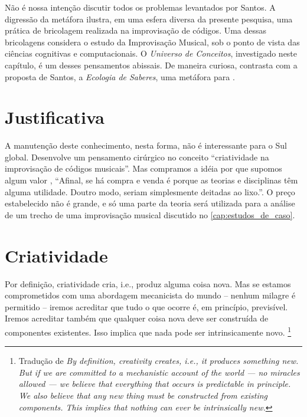 Não é nossa intenção discutir todos os problemas levantados por Santos. A digressão da metáfora  ilustra, em uma esfera diversa da presente pesquisa, uma prática de bricolagem realizada na improvisação de códigos. Uma dessas bricolagens considera o estudo da Improvisação Musical, sob o ponto de vista das ciências cognitivas e computacionais. O \emph{Universo de Conceitos}, investigado neste capítulo, é um desses pensamentos abissais. De maneira curiosa, contrasta com a proposta de Santos, a \emph{Ecologia de Saberes}, uma metáfora para .

\section{Justificativa}

 A manutenção deste conhecimento, nesta forma, não é interessante para o Sul global. Desenvolve um pensamento cirúrgico no conceito ``criatividade na improvisação de códigos musicais''. Mas compramos a idéia por que supomos algum valor \cite[p.~20]{santos_filosofia_2008}, ``Afinal, se há compra e venda é porque as teorias e disciplinas têm alguma utilidade. Doutro modo, seriam simplesmente deitadas ao lixo.''. O preço estabelecido não é grande, e só uma parte da teoria será utilizada para a análise de um trecho de uma improvisação musical discutido no \autoref{cap:estudos_de_caso}.

\section{Criatividade}\label{sec:sistemas_criativos}

\begin{citacao}
Por definição, criatividade cria, i.e., produz alguma coisa nova. Mas se estamos comprometidos com uma abordagem mecanicista do mundo -- nenhum milagre é permitido -- iremos acreditar que tudo o que ocorre é, em princípio,  previsível. Iremos acreditar também que qualquer coisa nova deve ser construída de componentes existentes. Isso implica que nada pode ser intrinsicamente novo. \cite[p.~2]{thornton_quantitative_2007}\footnote{Tradução de \emph{By definition, creativity creates, i.e., it produces something new. But if we are committed to a mechanistic account of the world — no miracles allowed — we believe that everything that occurs is predictable in principle. We also believe that any new thing must be constructed from existing components. This implies that nothing can ever be intrinsically new.}}
\end{citacao}
 
